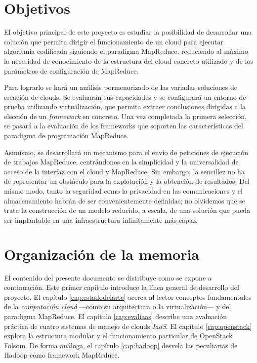 \section{Objetivos}\label{sec:objetivos}

\noindent El objetivo principal de este proyecto es estudiar la posibilidad de desarrollar una soluci\'on que permita dirigir el funcionamiento de un cloud para ejecutar algoritmia codificada siguiendo el paradigma MapReduce, reduciendo al m\'aximo la necesidad de conocimiento de la estructura del cloud concreto utilizado y de los par\'ametros de configuraci\'on de MapReduce.\newline

Para lograrlo se har\'a un an\'alisis pormenorizado de las variadas soluciones de creaci\'on de clouds. Se evaluar\'an sus capacidades y se configurar\'a un entorno de prueba utilizando virtualizaci\'on, que permita extraer conclusiones dirigidas a la elecci\'on de un \emph{framework} en concreto. Una vez completada la primera selecci\'on, se pasar\'a a la evaluaci\'on de los frameworks que soporten las caracter\'isticas del paradigma de programaci\'on MapReduce.\newline

Asimismo, se desarrollar\'a un mecanismo para el env\'io de peticiones de ejecuci\'on de trabajos MapReduce, centr\'andonos en la simplicidad y la universalidad de acceso de la interfaz con el cloud y MapReduce. Sin embargo, la sencillez no ha de representar un obst\'aculo para la explotaci\'on y la obtenci\'on de resultados. Del mismo modo, tanto la seguridad como la privacidad en las comunicaciones y el almacenamiento habr\'an de ser convenientemente definidas; no olvidemos que se trata la construcci\'on de un modelo reducido, a escala, de una soluci\'on que pueda ser implantable en una infraestructura infinitamente m\'as capaz.


\section{Organizaci\'on de la memoria}\label{sec:organizacion}
\noindent El contenido del presente documento se distribuye como se expone a continuaci\'on. Este primer cap\'itulo introduce la l\'inea general de desarrollo del proyecto. El cap\'itulo \ref{cap:estadodelarte} acerca al lector conceptos fundamentales de la \emph{computaci\'on cloud} ---como su arquitectura o la virtualizaci\'on--- y del paradigma MapReduce. El cap\'itulo \ref{cap:evaliaas} describe una evaluaci\'on pr\'actica de cuatro sistemas de manejo de clouds \emph{IaaS}. El cap\'itulo \ref{cap:openstack} explora la estructura modular y el funcionamiento particular de OpenStack Folsom. De forma an\'aloga, el cap\'itulo \ref{cap:hadoop} desvela las peculiarias de Hadoop como framework MapReduce. \newline

